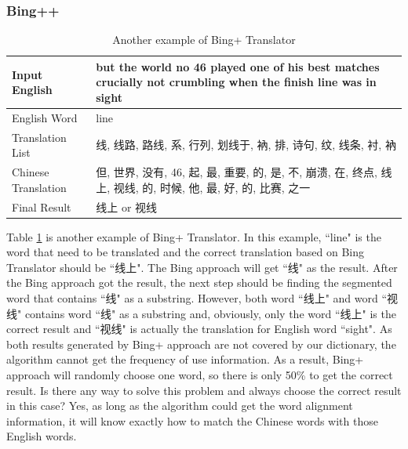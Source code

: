 \begin{CJK}{UTF8}{gbsn}
\subsubsection{Bing++}
\begin{table}[ht]
    \caption{Another example of Bing+ Translator}
    \label{table:bing_plus_plus_1}
    \begin{center}
    \begin{tabular}{| p{2.5cm} | p{4cm} |}
        \hline
        Input English & but the world no 46 played one of his best matches crucially not crumbling when the finish line was in sight\\
        \hline
        English Word & line \\
        \hline
        Translation List & \parbox[t]{4cm}{线, 线路, 路线, 系, 行列, 划线于, 衲, 排, 诗句, 纹, 线条, 衬, 衲}\\
        \hline
        Chinese Translation & 但, 世界, 没有, 46, 起, 最, 重要, 的, 是, 不, 崩溃, 在, 终点, 线上, 视线, 的, 时候, 他, 最, 好, 的, 比赛, 之一\\
        \hline
        Final Result & 线上 or 视线\\
        \hline
    \end{tabular}
    \end{center}
\end{table}
Table \ref{table:bing_plus_plus_1} is another example of Bing+ Translator. In this example, ``line" is the word that need to be translated and the correct translation based on Bing Translator should be ``线上". The Bing approach will get ``线" as the result. After the Bing approach got the result, the next step should be finding the segmented word that contains ``线" as a substring. However, both word ``线上" and word ``视线" contains word ``线" as a substring and, obviously, only the word ``线上" is the correct result and ``视线" is actually the translation for English word ``sight". As both results generated by Bing+ approach are not covered by our dictionary, the algorithm cannot get the frequency of use information. As a result, Bing+ approach will randomly choose one word, so there is only 50\% to get the correct result. Is there any way to solve this problem and always choose the correct result in this case? Yes, as long as the algorithm could get the word alignment information, it will know exactly how to match the Chinese words with those English words.


\end{CJK}

